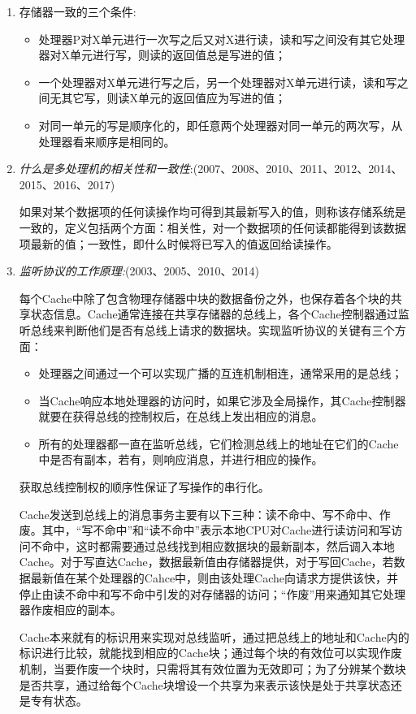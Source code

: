 \documentclass[a4paper]{ctexart}
\begin{document}
\begin{enumerate}
  \item {\color{grey}存储器一致的三个条件:
  \begin{itemize}
    \item 处理器P对X单元进行一次写之后又对X进行读，读和写之间没有其它处理器对X单元进行写，则读的返回值总是写进的值；
    \item 一个处理器对X单元进行写之后，另一个处理器对X单元进行读，读和写之间无其它写，则读X单元的返回值应为写进的值；
    \item 对同一单元的写是顺序化的，即任意两个处理器对同一单元的两次写，从处理器看来顺序是相同的。
  \end{itemize}}
  
  \item \emph{什么是多处理机的相关性和一致性}:(2007、2008、2010、2011、2012、2014、2015、2016、2017)
  
  如果对某个数据项的任何读操作均可得到其最新写入的值，则称该存储系统是一致的，定义包括两个方面：相关性，对一个数据项的任何读都能得到该数据项最新的值；一致性，即什么时候将已写入的值返回给读操作。
    
  \item \emph{监听协议的工作原理:}(2003、2005、2010、2014)
  
  每个Cache中除了包含物理存储器中块的数据备份之外，也保存着各个块的共享状态信息。Cache通常连接在共享存储器的总线上，各个Cache控制器通过监听总线来判断他们是否有总线上请求的数据块。实现监听协议的关键有三个方面：
  \begin{itemize}
    \item 处理器之间通过一个可以实现广播的互连机制相连，通常采用的是总线；
    \item 当Cache响应本地处理器的访问时，如果它涉及全局操作，其Cache控制器就要在获得总线的控制权后，在总线上发出相应的消息。
    \item 所有的处理器都一直在监听总线，它们检测总线上的地址在它们的Cache中是否有副本，若有，则响应消息，并进行相应的操作。
  \end{itemize}
  获取总线控制权的顺序性保证了写操作的串行化。
  
  Cache发送到总线上的消息事务主要有以下三种：读不命中、写不命中、作废。其中，“写不命中”和“读不命中”表示本地CPU对Cache进行读访问和写访问不命中，这时都需要通过总线找到相应数据块的最新副本，然后调入本地Cache。对于写直达Cache，数据最新值由存储器提供，对于写回Cache，若数据最新值在某个处理器的Cahce中，则由该处理Cache向请求方提供该快，并停止由读不命中和写不命中引发的对存储器的访问；“作废”用来通知其它处理器作废相应的副本。
  
  Cache本来就有的标识用来实现对总线监听，通过把总线上的地址和Cache内的标识进行比较，就能找到相应的Cache块；通过每个块的有效位可以实现作废机制，当要作废一个块时，只需将其有效位置为无效即可；为了分辨某个数块是否共享，通过给每个Cache块增设一个共享为来表示该快是处于共享状态还是专有状态。
    

\end{enumerate}
\end{document}
